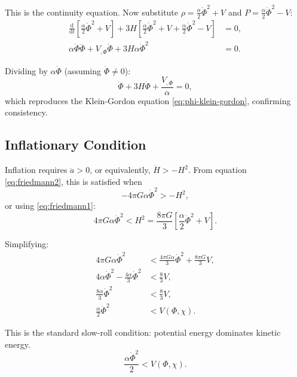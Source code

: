\documentclass[11pt,a4paper]{article}
\numberwithin{equation}{section}
\theoremstyle{plain}
\theoremstyle{definition}
\theoremstyle{remark}
\newcommand{\dd}{\mathrm{d}}
\begin{document}
This is the continuity equation. Now substitute $\rho = \frac{\alpha}{2}\dot{\Phi}^2 + V$ and $P = \frac{\alpha}{2}\dot{\Phi}^2 - V$:
\begin{align}
\frac{\dd}{\dd t}\left[\frac{\alpha}{2}\dot{\Phi}^2 + V\right] + 3H\left[\frac{\alpha}{2}\dot{\Phi}^2 + V + \frac{\alpha}{2}\dot{\Phi}^2 - V\right] &= 0,\\
\alpha\dot{\Phi}\ddot{\Phi} + V_{,\Phi}\dot{\Phi} + 3H\alpha\dot{\Phi}^2 &= 0.
\end{align}

Dividing by $\alpha\dot{\Phi}$ (assuming $\dot{\Phi} \neq 0$):
\begin{equation}
\ddot{\Phi} + 3H\dot{\Phi} + \frac{V_{,\Phi}}{\alpha} = 0,
\label{eq:continuity-to-KG}
\end{equation}
which reproduces the Klein-Gordon equation \eqref{eq:phi-klein-gordon}, confirming consistency.

\subsection{Inflationary Condition}

Inflation requires $\ddot{a} > 0$, or equivalently, $\dot{H} > -H^2$. From equation \eqref{eq:friedmann2}, this is satisfied when
\begin{equation}
-4\pi G\alpha\dot{\Phi}^2 > -H^2,
\end{equation}
or using \eqref{eq:friedmann1}:
\begin{equation}
4\pi G\alpha\dot{\Phi}^2 < H^2 = \frac{8\pi G}{3}\left[\frac{\alpha}{2}\dot{\Phi}^2 + V\right].
\end{equation}

Simplifying:
\begin{align}
4\pi G\alpha\dot{\Phi}^2 &< \frac{4\pi G\alpha}{3}\dot{\Phi}^2 + \frac{8\pi G}{3}V,\\
4\alpha\dot{\Phi}^2 - \frac{4\alpha}{3}\dot{\Phi}^2 &< \frac{8}{3}V,\\
\frac{8\alpha}{3}\dot{\Phi}^2 &< \frac{8}{3}V,\\
\frac{\alpha}{2}\dot{\Phi}^2 &< V(\Phi,\chi).
\end{align}

This is the standard slow-roll condition: potential energy dominates kinetic energy.
\begin{equation}
\frac{\alpha\dot{\Phi}^2}{2} < V(\Phi,\chi).
\label{eq:inflation-condition}
\end{equation}

\end{document}
